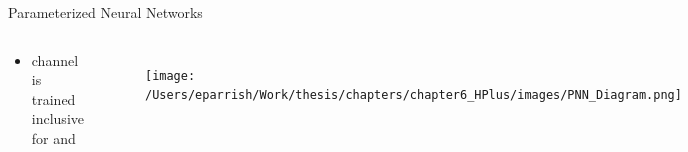 \documentclass[aspectratio=169,xcolor=table]{beamer}
\begin{document}
\begin{frame}[t]{Parameterized Neural Networks}
\begin{columns}[t]
\begin{itemize}
\begin{itemize}
\begin{itemize}
      \end{itemize}
      \item \taulep channel is trained inclusive for \tauel and \taumu
    \end{itemize}
      \end{itemize}
      \footnotesize
      \centering      
      \begin{figure}
        \centering
        \begin{columns}
        \texttt{[image: /Users/eparrish/Work/thesis/chapters/chapter6\_HPlus/images/PNN\_Diagram.png]}  
        \caption{\tiny \cite{PNN}}
        \end{columns}
      \end{figure}
      \texttt{[image: /Users/eparrish/Work/thesis/chapters/chapter6\_HPlus/images/kFoldDiagram\_noValid.pdf]}
      \begin{table}
        \end{table}

\end{columns}
\end{frame}
\end{document}
